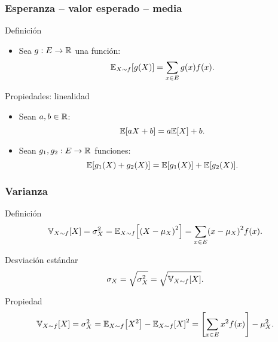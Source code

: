 \documentclass[table]{beamer}
\begin{document}
\begin{frame}
    \frametitle{Esperanza -- valor esperado -- media}
    \begin{block}{Definición}
        \begin{itemize}
            \item Sea $g : E \rightarrow \mathbb{R}$ una función:
                \begin{equation*}
                    \expecteddist{X \sim f}{g \parens{X}} = \sum_{x \in E} g \parens{x} \ff{x} .
                \end{equation*}
        \end{itemize}
    \end{block}
    \begin{block}{Propiedades: linealidad}
        \begin{itemize}
            \item Sean $a, b \in \mathbb{R}$:
                \begin{equation*}
                    \expected{a X + b} = a \expected{X} + b .
                \end{equation*}
            \item Sean $g_{1}, g_{2} : E \rightarrow \mathbb{R}$ funciones:
                \begin{equation*}
                    \expected{g_{1} \parens{X} + g_{2} \parens{X}} = \expected{g_1 \parens{X}} + \expected{g_{2} \parens{X}} .
                \end{equation*}
        \end{itemize}
    \end{block}
\end{frame}

\begin{frame}
    \frametitle{Varianza}
    \begin{block}{Definición}
        \begin{equation*}
            \variancedist{X \sim f}{X} = \sigma^{2}_{X} = \expecteddist{X \sim f}{\parens{X - \mu_{X}}^{2}} = \sum_{x \in E} \parens{x - \mu_{X}}^{2} \ff{x} .
        \end{equation*}
    \end{block}
    \begin{block}{Desviación estándar}
        \begin{equation*}
            \sigma_{X} = \sqrt{\sigma_{X}^{2}} = \sqrt{\variancedist{X \sim f}{X}} .
        \end{equation*}
    \end{block}
    \begin{block}{Propiedad}
        \begin{equation*}
            \variancedist{X \sim f}{X} = \sigma^{2}_{X} = \expecteddist{X \sim f}{X^{2}} - \expecteddist{X \sim f}{X}^{2}
            = \sparens{\sum_{x \in E} x^{2} \ff{x}} - \mu_{X}^{2} .
        \end{equation*}
    \end{block}
\end{frame}
\end{document}
